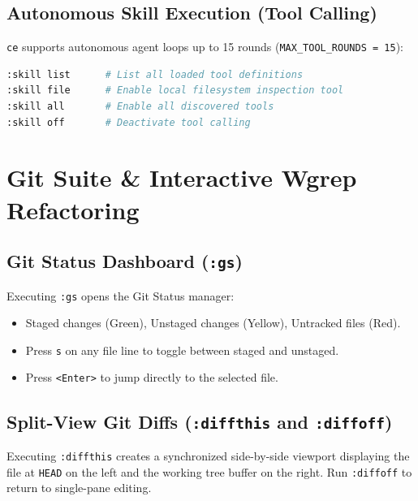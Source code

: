 \documentclass[11pt,a4paper,openany]{book}
\newcommand{\code}[1]{\colorbox{inlinebg}{\texttt{#1}}}
\begin{document}
\section{Autonomous Skill Execution (Tool Calling)}
\texttt{ce} supports autonomous agent loops up to 15 rounds (\code{MAX\_TOOL\_ROUNDS = 15}):
\begin{lstlisting}[language=bash]
:skill list      # List all loaded tool definitions
:skill file      # Enable local filesystem inspection tool
:skill all       # Enable all discovered tools
:skill off       # Deactivate tool calling
\end{lstlisting}

\chapter{Git Suite \& Interactive Wgrep Refactoring}

\section{Git Status Dashboard (\texttt{:gs})}
Executing \code{:gs} opens the Git Status manager:
\begin{itemize}[noitemsep]
    \item Staged changes (Green), Unstaged changes (Yellow), Untracked files (Red).
    \item Press \code{s} on any file line to toggle between staged and unstaged.
    \item Press \code{<Enter>} to jump directly to the selected file.
\end{itemize}

\section{Split-View Git Diffs (\texttt{:diffthis} and \texttt{:diffoff})}
Executing \code{:diffthis} creates a synchronized side-by-side viewport displaying the file at \texttt{HEAD} on the left and the working tree buffer on the right. Run \code{:diffoff} to return to single-pane editing.
\end{document}

